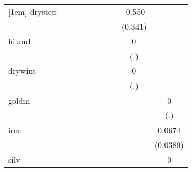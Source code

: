 {\begin{tabular}{l*{9}{c}}
[1em]
drystep     &                     &                     &                     &                     &                     &                     &                     &      -0.550         &                     \\
            &                     &                     &                     &                     &                     &                     &                     &     (0.341)         &                     \\
[1em]
hiland      &                     &                     &                     &                     &                     &                     &                     &           0         &                     \\
            &                     &                     &                     &                     &                     &                     &                     &         (.)         &                     \\
[1em]
drywint     &                     &                     &                     &                     &                     &                     &                     &           0         &                     \\
            &                     &                     &                     &                     &                     &                     &                     &         (.)         &                     \\
[1em]
goldm       &                     &                     &                     &                     &                     &                     &                     &                     &           0         \\
            &                     &                     &                     &                     &                     &                     &                     &                     &         (.)         \\
[1em]
iron        &                     &                     &                     &                     &                     &                     &                     &                     &      0.0674\sym{*}  \\
            &                     &                     &                     &                     &                     &                     &                     &                     &    (0.0389)         \\
[1em]
silv        &                     &                     &                     &                     &                     &                     &                     &                     &           0         \\

\end{tabular}}
